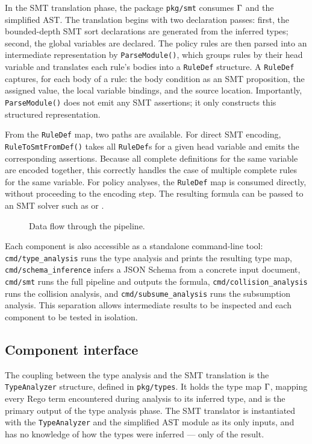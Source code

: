 In the SMT translation phase, the package \texttt{pkg/smt} consumes $\Gamma$ and the
simplified AST.
The translation begins with two declaration passes: first, the bounded-depth SMT sort
declarations are generated from the inferred types; second, the global variables are
declared.
The policy rules are then parsed into an intermediate representation by \texttt{ParseModule()}, which groups rules by their head variable and translates each rule's bodies into a \texttt{RuleDef} structure.
A \texttt{RuleDef} captures, for each body of a rule: the body condition as an SMT proposition, the assigned value, the local variable bindings, and the source location.
Importantly, \texttt{ParseModule()} does not emit any SMT assertions; it only constructs this structured representation.

From the \texttt{RuleDef} map, two paths are available.
For direct SMT encoding, \texttt{RuleToSmtFromDef()} takes all \texttt{RuleDef}s for a
given head variable and emits the corresponding \smtlib{} assertions.
Because all complete definitions for the same variable are encoded together, this
correctly handles the case of multiple complete rules for the same variable.
For policy analyses, the \texttt{RuleDef} map is consumed directly, without proceeding
to the encoding step.
The resulting \smtlib{} formula can be passed to an SMT solver such as \ziii{} or \cvcv{}.

\begin{figure}
    \centering
    
    \caption{Data flow through the \verirego{} pipeline.}
    \label{fig:pipeline}
\end{figure}

Each component is also accessible as a standalone command-line tool: \texttt{cmd/type\_analysis}
runs the type analysis and prints the resulting type map, \texttt{cmd/schema\_inference}
infers a JSON Schema from a concrete input document, \texttt{cmd/smt} runs the full
pipeline and outputs the \smtlib{} formula, \texttt{cmd/collision\_analysis} runs the
collision analysis, and \texttt{cmd/subsume\_analysis} runs the subsumption analysis.
This separation allows intermediate results to be inspected and each component to be
tested in isolation.

\subsection{Component interface}
\label{ss:interface}

The coupling between the type analysis and the SMT translation is the \texttt{TypeAnalyzer}
structure, defined in \texttt{pkg/types}.
It holds the type map $\Gamma$, mapping every Rego term encountered during analysis to
its inferred type, and is the primary output of the type analysis phase.
The SMT translator is instantiated with the \texttt{TypeAnalyzer} and the simplified AST
module as its only inputs, and has no knowledge of how the types were inferred --- only
of the result.

